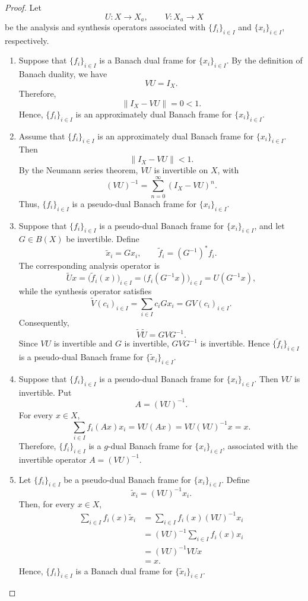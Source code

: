 \documentclass[10pt,a4paper]{amsart}
\begin{document}
\begin{proof}
	Let
	\[
	U:X\to X_a,\qquad V:X_a\to X
	\]
	be the analysis and synthesis operators associated with
	\(\{f_i\}_{i\in I}\) and \(\{x_i\}_{i\in I}\), respectively.
	
	\begin{enumerate}
		\item Suppose that \(\{f_i\}_{i\in I}\) is a Banach dual frame for
		\(\{x_i\}_{i\in I}\). By the definition of Banach duality, we have
		\[
		VU=I_X.
		\]
		Therefore,
		\[
		\|I_X-VU\|=0<1.
		\]
		Hence, \(\{f_i\}_{i\in I}\) is an approximately dual Banach frame
		for \(\{x_i\}_{i\in I}\).
		
		\item Assume that \(\{f_i\}_{i\in I}\) is an approximately dual
		Banach frame for \(\{x_i\}_{i\in I}\). Then
		\[
		\|I_X-VU\|<1.
		\]
		By the Neumann series theorem, \(VU\) is invertible on \(X\), with
		\[
		(VU)^{-1}
		=
		\sum_{n=0}^{\infty}(I_X-VU)^n.
		\]
		Thus, \(\{f_i\}_{i\in I}\) is a pseudo-dual Banach frame for
		\(\{x_i\}_{i\in I}\).
		
		\item Suppose that \(\{f_i\}_{i\in I}\) is a pseudo-dual Banach
		frame for \(\{x_i\}_{i\in I}\), and let \(G\in B(X)\) be invertible.
		Define
		\[
		\widetilde{x}_i=Gx_i,
		\qquad
		\widetilde{f}_i=(G^{-1})^*f_i.
		\]
		The corresponding analysis operator is
		\[
		\widetilde{U}x
		=
		\bigl(\widetilde{f}_i(x)\bigr)_{i\in I}
		=
		\bigl(f_i(G^{-1}x)\bigr)_{i\in I}
		=
		U(G^{-1}x),
		\]
		while the synthesis operator satisfies
		\[
		\widetilde{V}(c_i)_{i\in I}
		=
		\sum_{i\in I}c_iGx_i
		=
		G V(c_i)_{i\in I}.
		\]
		Consequently,
		\[
		\widetilde{V}\widetilde{U}
		=
		GV G^{-1}.
		\]
		Since \(VU\) is invertible and \(G\) is invertible,
		\(GVG^{-1}\) is invertible. Hence
		\(\{\widetilde{f}_i\}_{i\in I}\) is a pseudo-dual Banach frame
		for \(\{\widetilde{x}_i\}_{i\in I}\).
		
		\item Suppose that \(\{f_i\}_{i\in I}\) is a pseudo-dual Banach
		frame for \(\{x_i\}_{i\in I}\). Then \(VU\) is invertible. Put
		\[
		A=(VU)^{-1}.
		\]
		For every \(x\in X\),
		\[
		\sum_{i\in I}f_i(Ax)x_i
		=
		VU(Ax)
		=
		VU(VU)^{-1}x
		=
		x.
		\]
		Therefore, \(\{f_i\}_{i\in I}\) is a \(g\)-dual Banach frame for
		\(\{x_i\}_{i\in I}\), associated with the invertible operator
		\(A=(VU)^{-1}\).
		
		\item Let \(\{f_i\}_{i\in I}\) be a pseudo-dual Banach frame for
		\(\{x_i\}_{i\in I}\). Define
		\[
		\widetilde{x}_i=(VU)^{-1}x_i.
		\]
		Then, for every \(x\in X\),
		\[
		\begin{aligned}
			\sum_{i\in I}f_i(x)\widetilde{x}_i
			&=
			\sum_{i\in I}f_i(x)(VU)^{-1}x_i\\
			&=
			(VU)^{-1}
			\sum_{i\in I}f_i(x)x_i\\
			&=
			(VU)^{-1}VUx\\
			&=x.
		\end{aligned}
		\]
		Hence, \(\{f_i\}_{i\in I}\) is a Banach dual frame for
		\(\{\widetilde{x}_i\}_{i\in I}\).
		

\end{enumerate}
\end{proof}
\end{document}
